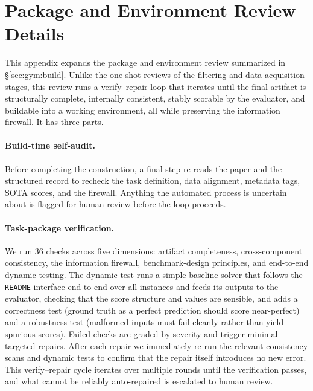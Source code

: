 \appendix

\section{Package and Environment Review Details}
\label{app:package-review}

This appendix expands the package and environment review summarized in \S\ref{sec:gym:build}. Unlike the one-shot reviews of the filtering and data-acquisition stages, this review runs a verify--repair loop that iterates until the final artifact is structurally complete, internally consistent, stably scorable by the evaluator, and buildable into a working environment, all while preserving the information firewall. It has three parts.

\paragraph{Build-time self-audit.}
Before completing the construction, a final step re-reads the paper and the structured record to recheck the task definition, data alignment, metadata tags, SOTA scores, and the firewall. Anything the automated process is uncertain about is flagged for human review before the loop proceeds.

\paragraph{Task-package verification.}
We run 36 checks across five dimensions: artifact completeness, cross-component consistency, the information firewall, benchmark-design principles, and end-to-end dynamic testing. The dynamic test runs a simple baseline solver that follows the \texttt{README} interface end to end over all instances and feeds its outputs to the evaluator, checking that the score structure and values are sensible, and adds a correctness test (ground truth as a perfect prediction should score near-perfect) and a robustness test (malformed inputs must fail cleanly rather than yield spurious scores). Failed checks are graded by severity and trigger minimal targeted repairs. After each repair we immediately re-run the relevant consistency scans and dynamic tests to confirm that the repair itself introduces no new error. This verify--repair cycle iterates over multiple rounds until the verification passes, and what cannot be reliably auto-repaired is escalated to human review.

